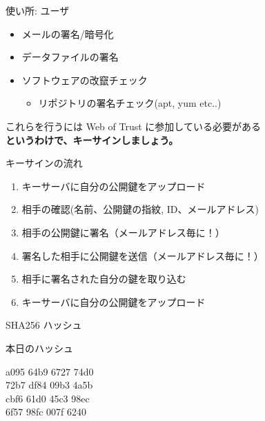 \begin{frame}{使い所: ユーザ}
\begin{itemize}
  \item メールの署名/暗号化
  \item データファイルの署名
  \item ソフトウェアの改竄チェック
  \begin{itemize}
    \item リポジトリの署名チェック(apt, yum etc..)
  \end{itemize}
\end{itemize}
\end{frame}


\begin{frame}
  \begin{center}

これらを行うには Web of Trust に参加している必要がある \\ \pause
\Huge\bfseries 
というわけで、キーサインしましょう。
  \end{center}
\end{frame}


\begin{frame}{キーサインの流れ}
\begin{enumerate}
  \item キーサーバに自分の公開鍵をアップロード
  \item 相手の確認(名前、公開鍵の指紋, ID、メールアドレス)
  \item 相手の公開鍵に署名（メールアドレス毎に！）
  \item 署名した相手に公開鍵を送信（メールアドレス毎に！）
  \item 相手に署名された自分の鍵を取り込む
  \item キーサーバに自分の公開鍵をアップロード
\end{enumerate}
\end{frame}

\begin{frame}{SHA256 ハッシュ}
\begin{center}
本日のハッシュ\\
\Huge

a095 64b9 6727 74d0 \\
72b7 df84 09b3 4a5b \\
cbf6 61d0 45c3 98ec \\
6f57 98fc 007f 6240 \\

\end{center}
\end{frame}

